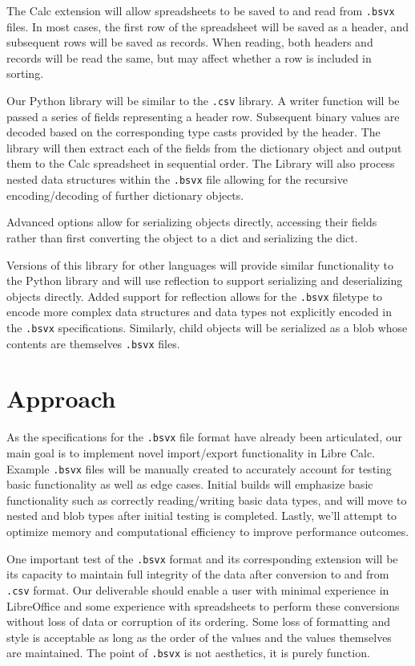 \documentclass[10pt]{article}
\begin{document}
\indent{}
The Calc extension will allow spreadsheets to be saved to and read from \texttt{.bsvx} files.
In most cases, the first row of the spreadsheet will be saved as a header, and subsequent rows will be saved as records.
When reading, both headers and records will be read the same, but may affect whether a row is included in sorting.

\indent{}
Our Python library will be similar to the \texttt{.csv} library.
A writer function will be passed a series of fields representing a header row. 
Subsequent binary values are decoded based on the corresponding type casts provided by the header.
The library will then extract each of the fields from the dictionary object and output them to the Calc spreadsheet in sequential order.
The Library will also process nested data structures within the \texttt{.bsvx} file allowing for the recursive encoding/decoding of further dictionary objects.

\indent{}
Advanced options allow for serializing objects directly, accessing their fields rather than first converting the object to a dict and serializing the dict.

\indent{}
Versions of this library for other languages will provide similar functionality to the Python library and will use reflection to support serializing and deserializing objects directly.
Added support for reflection allows for the \texttt{.bsvx} filetype to encode more complex data structures and data types not explicitly encoded in the \texttt{.bsvx} specifications.
Similarly, child objects will be serialized as a blob whose contents are themselves \texttt{.bsvx} files.

\section*{Approach}

As the specifications for the \texttt{.bsvx} file format have already been articulated, our main goal is to implement novel import/export functionality in Libre Calc.
Example \texttt{.bsvx} files will be manually created to accurately account for testing basic functionality as well as edge cases.
Initial builds will emphasize basic functionality such as correctly reading/writing basic data types, and will move to nested and blob types after initial testing is completed.
Lastly, we’ll attempt to optimize memory and computational efficiency to improve performance outcomes.

\indent{}
One important test of the \texttt{.bsvx} format and its corresponding extension will be its capacity to maintain full integrity of the data after conversion to and from \texttt{.csv} format.
Our deliverable should enable a user with minimal experience in LibreOffice and some experience with spreadsheets to perform these conversions without loss of data or corruption of its ordering.
Some loss of formatting and style is acceptable as long as the order of the values and the values themselves are maintained.
The point of \texttt{.bsvx} is not aesthetics, it is purely function.
\end{document}
